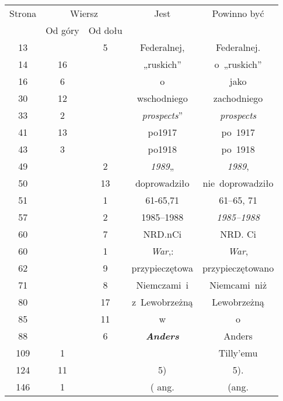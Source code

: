 \documentclass[a4paper,11pt]{article}
\numberwithin{equation}{section}
\begin{document}
\begin{center}

  \begin{tabular}{|c|c|c|c|c|}
    \hline
    Strona & \multicolumn{2}{c|}{Wiersz} & Jest
                              & Powinno być \\ \cline{2-3}
    & Od góry & Od dołu & & \\
    \hline
    13  & &  5 & Federalnej, & Federalnej. \\
    14  & 16 & & „ruskich” & o~„ruskich” \\
    16  &  6 & & o & jako \\
    30  & 12 & & wschodniego & zachodniego \\
    33  &  2 & & \textit{prospects}” & \textit{prospects} \\
    41  & 13 & & po1917 & po~1917 \\
    43  &  3 & & po1918 & po~1918 \\
    49  & &  2 & \textit{1989}„ & \textit{1989}, \\
    50  & & 13 & doprowadziło & nie~doprowadziło \\
    51  & &  1 & 61-65,71 & 61--65, 71 \\
    57  & &  2 & 1985--1988 & \textit{1985--1988} \\
    60  & &  7 & NRD.nCi & NRD. Ci \\
    60  & &  1 & \textit{War},: & \textit{War}, \\
    62  & &  9 & przypieczętowa & przypieczętowano \\
    71  & &  8 & Niemczami~i & Niemcami~niż \\
    80  & & 17 & z~Lewobrzeżną & Lewobrzeżną \\
    85  & & 11 & w & o \\
    88  & &  6 & \textbf{\textit{Anders}} & Anders \\
    109 &  1 & & & Tilly’emu \\
    124 & 11 & & 5) & 5). \\
    146 &  1 & & ( ang. & (ang. \\
    \hline
  \end{tabular}

\end{center}
\end{document}
